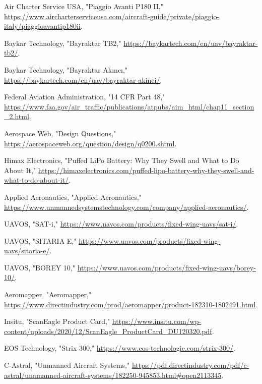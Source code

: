 \documentclass[12pt]{article}
\begin{document}
	\newpage
	\begin{thebibliography}{99}
		
		Air Charter Service USA, "Piaggio Avanti P180 II," \url{https://www.aircharterserviceusa.com/aircraft-guide/private/piaggio-italy/piaggioavantip180ii}.
		
		Baykar Technology, "Bayraktar TB2," \url{https://baykartech.com/en/uav/bayraktar-tb2/}.
		
		Baykar Technology, "Bayraktar Akıncı," \url{https://baykartech.com/en/uav/bayraktar-akinci/}.
		
		Federal Aviation Administration, "14 CFR Part 48," \url{https://www.faa.gov/air_traffic/publications/atpubs/aim_html/chap11_section_2.html}.
		
		Aerospace Web, "Design Questions," \url{https://aerospaceweb.org/question/design/q0200.shtml}.
		
		Himax Electronics, "Puffed LiPo Battery: Why They Swell and What to Do About It," \url{https://himaxelectronics.com/puffed-lipo-battery-why-they-swell-and-what-to-do-about-it/}.
		
		Applied Aeronautics, "Applied Aeronautics," \url{https://www.unmannedsystemstechnology.com/company/applied-aeronautics/}.
		
		UAVOS, "SAT-i," \url{https://www.uavos.com/products/fixed-wing-uavs/sat-i/}.
		
		UAVOS, "SITARIA E," \url{https://www.uavos.com/products/fixed-wing-uavs/sitaria-e/}.
		
		UAVOS, "BOREY 10," \url{https://www.uavos.com/products/fixed-wing-uavs/borey-10/}.
		
		Aeromapper, "Aeromapper," \url{https://www.directindustry.com/prod/aeromapper/product-182310-1802491.html}.
		
		Insitu, "ScanEagle Product Card," \url{https://www.insitu.com/wp-content/uploads/2020/12/ScanEagle_ProductCard_DU120320.pdf}.
		
		EOS Technology, "Strix 300," \url{https://www.eos-technologie.com/strix-300/}.
		
		C-Astral, "Unmanned Aircraft Systems," \url{https://pdf.directindustry.com/pdf/c-astral/unamanned-aircraft-systems/182250-945853.html#open2113345}.
		

\end{thebibliography}
\end{document}
